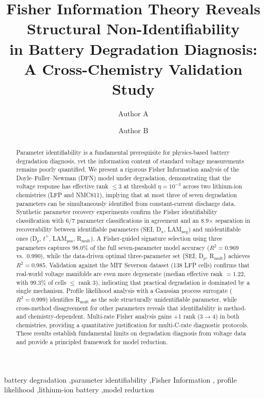 \documentclass[preprint,12pt]{elsarticle}
\begin{document}
\begin{frontmatter}

\title{Fisher Information Theory Reveals Structural Non-Identifiability\\
in Battery Degradation Diagnosis:\\
A Cross-Chemistry Validation Study}

\author[inst1]{Author A}
\author[inst1]{Author B}
\address[inst1]{Department of Energy Engineering, University, City, Country}

\begin{abstract}
Parameter identifiability is a fundamental prerequisite for physics-based battery degradation diagnosis, yet the information content of standard voltage measurements remains poorly quantified.
We present a rigorous Fisher Information analysis of the Doyle--Fuller--Newman (DFN) model under degradation, demonstrating that the voltage response has effective rank $\leq 3$ at threshold $\eta = 10^{-3}$ across two lithium-ion chemistries (LFP and NMC811), implying that at most three of seven degradation parameters can be simultaneously identified from constant-current discharge data.
Synthetic parameter recovery experiments confirm the Fisher identifiability classification with 6/7 parameter classifications in agreement and an 8.9$\times$ separation in recoverability between identifiable parameters (SEI, D$_n$, LAM$_{\mathrm{neg}}$) and unidentifiable ones (D$_p$, $t^+$, LAM$_{\mathrm{pos}}$, R$_{\mathrm{mult}}$).
A Fisher-guided signature selection using three parameters captures 98.0\% of the full seven-parameter model accuracy ($R^2 = 0.969$ vs.\ $0.990$), while the data-driven optimal three-parameter set \{SEI, D$_p$, R$_{\mathrm{mult}}$\} achieves $R^2 = 0.985$.
Validation against the MIT Severson dataset (138 LFP cells) confirms that real-world voltage manifolds are even more degenerate (median effective rank $= 1.22$, with 99.3\% of cells $\leq$ rank 3), indicating that practical degradation is dominated by a single mechanism.
Profile likelihood analysis with a Gaussian process surrogate ($R^2 = 0.999$) identifies R$_{\mathrm{mult}}$ as the sole structurally unidentifiable parameter, while cross-method disagreement for other parameters reveals that identifiability is method- and chemistry-dependent.
Multi-rate Fisher analysis gains +1 rank (3$\to$4) in both chemistries, providing a quantitative justification for multi-C-rate diagnostic protocols.
These results establish fundamental limits on degradation diagnosis from voltage data and provide a principled framework for model reduction.
\end{abstract}

\begin{keyword}
battery degradation \sep parameter identifiability \sep Fisher Information \sep
profile likelihood \sep lithium-ion battery \sep model reduction
\end{keyword}

\end{frontmatter}
\end{document}
